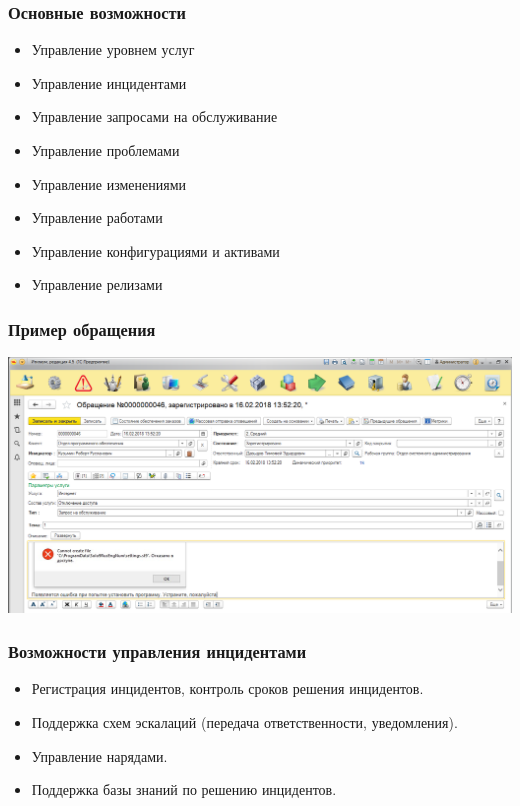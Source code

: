 \documentclass{../industrial-development}
\begin{document}
\begin{frame} \frametitle{Основные возможности}
	\begin{itemize}
    \item Управление уровнем услуг
    \item Управление инцидентами
    \item Управление запросами на обслуживание
    \item Управление проблемами
    \item Управление изменениями
    \item Управление работами
    \item Управление конфигурациями и активами
    \item Управление релизами
	\end{itemize}
\end{frame}
\lecturenotes

\begin{frame} \frametitle{Пример обращения}
\centerline{\includegraphics[width=\textwidth]{pic12.png}}
\end{frame}
\lecturenotes

\begin{frame} \frametitle{Возможности управления инцидентами}
	\begin{itemize}
    \item Регистрация инцидентов, контроль сроков решения инцидентов.
    \item Поддержка схем эскалаций (передача ответственности, уведомления).
    \item Управление нарядами.
    \item Поддержка базы знаний по решению инцидентов.
	\end{itemize}
\end{frame}
\lecturenotes
\end{document}
